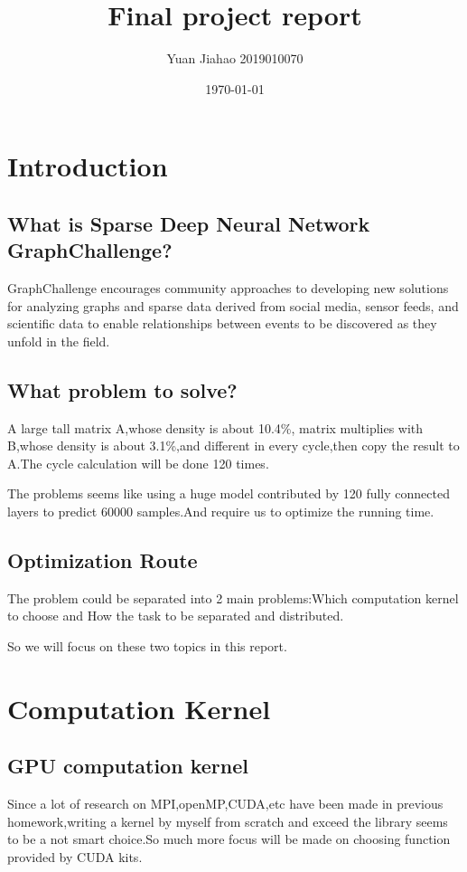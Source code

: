\documentclass[12pt]{scrartcl} %
\title{	
	Final project report
}
\author{Yuan Jiahao 2019010070} %
\date{\normalsize\today} %
\begin{document}
\maketitle %
\tableofcontents
\newpage

\section{Introduction}
\subsection{What is Sparse Deep Neural Network GraphChallenge?}
GraphChallenge encourages community approaches to developing new solutions for analyzing graphs and sparse data derived from social media, sensor feeds, and scientific data to enable relationships between events to be discovered as they unfold in the field.
\subsection{What problem to solve?}
A large tall matrix A,whose density is about 10.4\%, matrix multiplies with B,whose density is about 3.1\%,and different in every cycle,then copy the result to A.The cycle calculation will be done 120 times.

The problems seems like using a huge model contributed by 120 fully connected layers to predict 60000 samples.And require us to optimize the running time.
\subsection{Optimization Route}
The problem could be separated into 2 main problems:Which computation kernel to choose and How the task to be separated and distributed.

So we will focus on these two topics in this report.
\section{Computation Kernel}
\subsection{GPU computation kernel}
Since a lot of research on MPI,openMP,CUDA,etc have been made in previous homework,writing a kernel by myself from scratch and exceed the library seems to be a not smart choice.So much more focus will be made on choosing function provided by CUDA kits.
\end{document}
